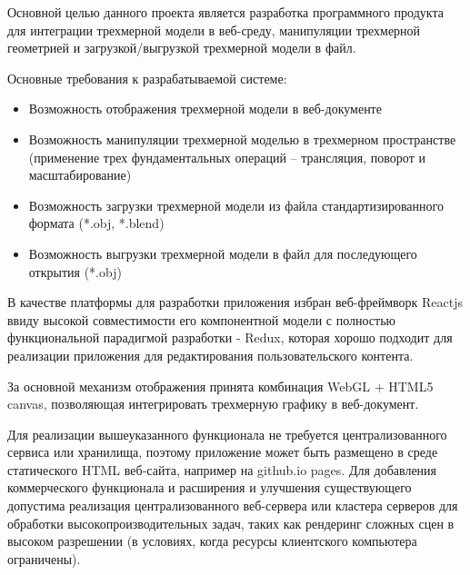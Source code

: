 Основной целью данного проекта является разработка программного продукта для интеграции трехмерной модели в веб-среду,
манипуляции трехмерной геометрией и загрузкой/выгрузкой трехмерной модели в файл.

Основные требования к разрабатываемой системе:
\begin{itemize}
\item Возможность отображения трехмерной модели в веб-документе
\item Возможность манипуляции трехмерной моделью в трехмерном пространстве (применение трех фундаментальных операций -- трансляция, поворот и масштабирование) 
\item Возможность загрузки трехмерной модели из файла стандартизированного формата (*.obj, *.blend)
\item Возможность выгрузки трехмерной модели в файл для последующего открытия (*.obj)
\end{itemize}

В качестве платформы для разработки
приложения избран веб-фреймворк Reactjs ввиду высокой совместимости его компонентной модели с полностью функциональной
парадигмой разработки - Redux, которая хорошо подходит для реализации приложения для редактирования пользовательского
контента.

За основной механизм отображения принята комбинация WebGL + HTML5 canvas, позволяющая интегрировать трехмерную графику в
веб-документ.

Для реализации вышеуказанного функционала не требуется централизованного сервиса или хранилища, поэтому приложение может быть
размещено в среде статического HTML веб-сайта, например на github.io pages. Для добавления коммерческого функционала и расширения и
улучшения существующего допустима реализация централизованного веб-сервера или кластера серверов для обработки высокопроизводительных
задач, таких как рендеринг сложных сцен в высоком разрешении (в условиях, когда ресурсы клиентского компьютера ограничены).